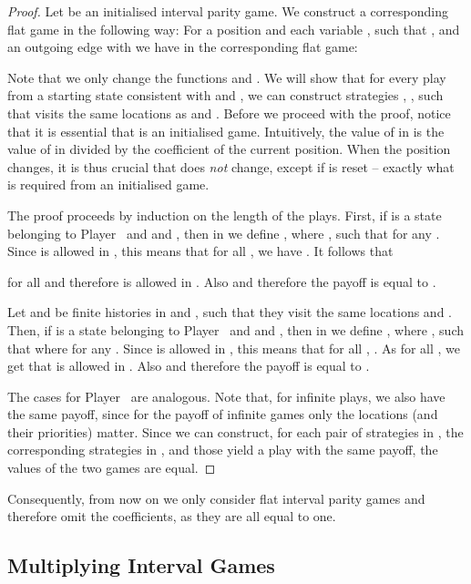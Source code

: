 \documentclass[fleqn,envcountsame]{LMCS}
\newcommand{\pzero}{Player~\xspace}
\newcommand{\pone}{Player~\xspace}
\begin{document}
\begin{proof}
Let 
be an initialised interval parity game.
We construct a corresponding flat game 
 in the following way:
For a position  and each variable , such that 
,  and an outgoing edge  with 
we have in the corresponding flat game:
\begin{iteMize}{}
\item 
\item 
\item 
\end{iteMize}
Note that we only change the functions  and .
We will show that for every play  from a starting state  consistent
with  and , we can construct strategies , ,
such that  visits the same locations as  and
. Before we proceed with the proof, notice that it is
essential that  is an initialised game. Intuitively, the value of 
in  is the value of  in  divided by the coefficient 
of the current position. When the position changes, it is thus crucial that
 does \emph{not} change, except if  is reset -- exactly what is
required from an initialised game.

The proof proceeds by induction on the length of the plays.
First, if  is a state belonging to \pzero and
 and , then in 
we define , where , such that
 for any .
Since  is allowed in , this means that for all
, we have
. It follows that

for all  and therefore  is allowed in .
Also  and therefore the payoff is
equal to .

Let  and  be finite histories in  and
, such that they visit the same locations and .
Then, if  is a state belonging to \pzero and
 and ,
then in  we define , where
, such that  where 
for any .
Since  is allowed in , this means that for
all , .
As  for
all , we get that  is allowed in .
Also  and therefore the payoff is equal
to .

The cases for \pone are analogous. Note that, for infinite plays,
we also have the same payoff, since for the payoff of infinite games only
the locations (and their priorities) matter. Since we can construct, for
each pair of strategies in , the corresponding strategies in ,
and those yield a play with the same payoff, the values of the two games
are equal.
\end{proof}

Consequently, from now on we only consider flat interval parity games and
therefore omit the coefficients, as they are all equal to one.


\subsection{Multiplying Interval Games}\label{subsec_mult}
\end{document}
